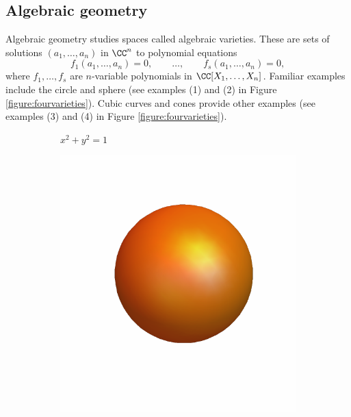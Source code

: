 \documentclass[12pt]{amsart}
\theoremstyle{plain}
\begin{document}
\newpage
\subsection*{Algebraic geometry}
Algebraic geometry studies spaces called algebraic varieties.
These are sets of solutions $(a_1, \ldots, a_n)$ in $\CC^n$ to polynomial equations
$$f_1(a_1, \ldots, a_n) = 0, \qquad \ldots, \qquad f_s(a_1, \ldots, a_n) = 0,$$
where $f_1, \ldots, f_s$ are  $n$-variable polynomials in $\CC[X_1, \ldots, X_n]$.
Familiar examples include the circle and sphere (see examples (1) and (2) in Figure \ref{figure:fourvarieties}).
Cubic curves and cones provide other examples (see examples (3) and (4) in Figure \ref{figure:fourvarieties}).

\begin{figure}[H]
    \centering
    \begin{subfigure}[t]{0.23\textwidth}
        \centering
	\vspace{-0cm}
	  \vspace{0.2cm}
        \caption{$x^2 + y^2 = 1$}
    \end{subfigure}
    \hfill
    \begin{subfigure}[t]{0.23\textwidth}
        \centering
	\vspace*{-0.8cm}
        \includegraphics[width=\linewidth]{../images/orange_sphere}

\end{subfigure}
\end{figure}
\end{document}
